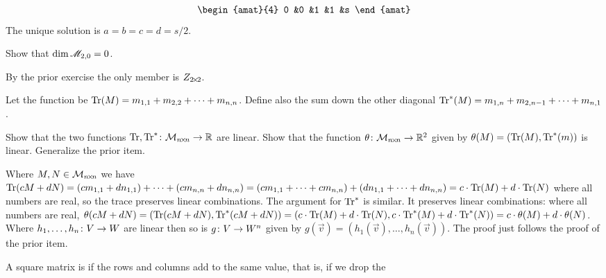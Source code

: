 \begin{exercises}
\begin{answer}
\begin{multline*}
\begin{amat}{4}
          0  &0  &1  &1  &s  
        \end{amat}
      \end{multline*}
      The unique solution is $a=b=c=d=s/2$.
    \end{answer}
  \item \label{exer:DimTwoMagicSqsMagicSumZero} 
    Show that $\dim\mathscr{M}_{2,0}=0$.
    \begin{answer}
       By the prior exercise the only member is $Z_{2 \! \times \! 2}$.
    \end{answer}
  \item   \label{exer:TraceIsLinear}
    Let the  function be 
    $\operatorname{Tr} (M)=m_{1,1}+m_{2,2}+\cdots+m_{n,n}$.
    Define also
    the sum down the other diagonal
    $\operatorname{Tr}^* (M)=m_{1,n}+m_{2,n-1}+\cdots+m_{n,1}$.
    \begin{exparts}
      \partsitem 
        Show that the two functions 
        $\mbox{$\operatorname{Tr},\operatorname{Tr}^*\colon \mathcal{M}_{n \! \times \! n}\to \mathbb{R}$}$
        are linear.
      \partsitem
        Show that the function
       $\mbox{$\theta\colon \mathcal{M}_{n \! \times \! n}\to \mathbb{R}^2$}$
       given by $\theta(M)=(\operatorname{Tr}(M),\operatorname{Tr}^*(m))$
       is linear.
     \partsitem
       Generalize the prior item. 
    \end{exparts}
    \begin{answer}
      \begin{exparts}
        \partsitem
          Where $M,N\in\mathcal{M}_{n \! \times \! n}$ we have 
          $\operatorname{Tr}(cM+dN)=(cm_{1,1}+dn_{1,1})+\cdots+(cm_{n,n}+dn_{n,n})
          =(cm_{1,1}+\cdots+cm_{n,n})+(dn_{1,1}+\cdots+dn_{n,n})
          =c\cdot\operatorname{Tr}(M)+d\cdot\operatorname{Tr}(N)$ where
          all numbers are real, so the trace preserves linear
         combinations.
         The argument for $\operatorname{Tr}^*$ is similar.
       \partsitem
         It preserves linear combinations: where all numbers are real,
          $\theta(cM+dN)=(\operatorname{Tr}(cM+dN),\operatorname{Tr}^*(cM+dN))
          =(c\cdot\operatorname{Tr}(M)+d\cdot\operatorname{Tr}(N), c\cdot\operatorname{Tr}^*(M)+d\cdot\operatorname{Tr}^*(N))
          =c\cdot\theta(M)+d\cdot\theta(N)$.
       \partsitem   
         Where $\mbox{$h_1,\ldots,h_n\colon V\to W$}$ are linear then so is
         $\mbox{$g\colon V\to W^n$}$ given by
         $g(\vec{v})=(h_1(\vec{v}), \ldots, h_n(\vec{v}))$.
         The proof just follows the proof of the prior item.
      \end{exparts}
    \end{answer}
  \item A square matrix is  if 
     the rows and columns add to the same value, that is, if we drop the

\end{exercises}
